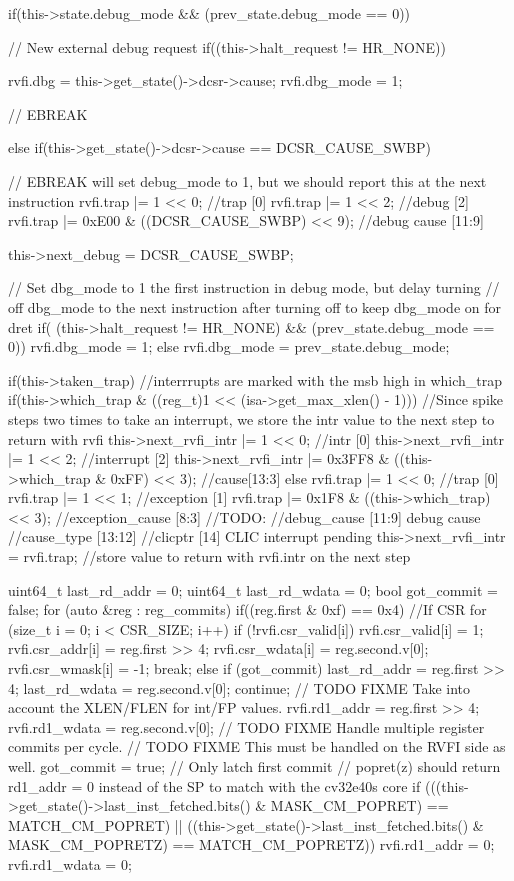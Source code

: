\begin{clisting}
{  if(this->state.debug_mode  && (prev_state.debug_mode == 0)){
    // New external debug request
    if((this->halt_request != HR_NONE)){ 
      rvfi.dbg = this->get_state()->dcsr->cause;
      rvfi.dbg_mode = 1;

    // EBREAK
    } else if(this->get_state()->dcsr->cause == DCSR_CAUSE_SWBP) {
      // EBREAK will set debug_mode to 1, but we should report this at the next instruction
      rvfi.trap |= 1 << 0; //trap [0]
      rvfi.trap |= 1 << 2; //debug [2]
      rvfi.trap |= 0xE00 & ((DCSR_CAUSE_SWBP) << 9); //debug cause [11:9]
      
      this->next_debug = DCSR_CAUSE_SWBP;
    }
  }

  // Set dbg_mode to 1 the first instruction in debug mode, but delay turning 
  // off dbg_mode to the next instruction after turning off to keep dbg_mode on for dret
  if( (this->halt_request != HR_NONE)  && (prev_state.debug_mode == 0)) {
    rvfi.dbg_mode = 1;
  } else {
    rvfi.dbg_mode = prev_state.debug_mode;
  }


  if(this->taken_trap) {
    //interrrupts are marked with the msb high in which_trap
    if(this->which_trap & ((reg_t)1 << (isa->get_max_xlen() - 1))) { 
      //Since spike steps two times to take an interrupt, we store the intr value to the next step to return with rvfi
      this->next_rvfi_intr |= 1 << 0; //intr [0]
      this->next_rvfi_intr |= 1 << 2; //interrupt [2]
      this->next_rvfi_intr |= 0x3FF8 & ((this->which_trap & 0xFF) << 3); //cause[13:3]
    } else{
      rvfi.trap |= 1 << 0; //trap [0]
      rvfi.trap |= 1 << 1; //exception [1]
      rvfi.trap |= 0x1F8 & ((this->which_trap) << 3); //exception_cause [8:3]
      //TODO:
      //debug_cause     [11:9] debug cause
      //cause_type      [13:12]
      //clicptr         [14]  CLIC interrupt pending
      this->next_rvfi_intr = rvfi.trap; //store value to return with rvfi.intr on the next step
    }
  }

  uint64_t last_rd_addr = 0;
  uint64_t last_rd_wdata = 0;
  bool got_commit = false;
  for (auto &reg : reg_commits) {
    if((reg.first & 0xf) == 0x4) { //If CSR
      for (size_t i = 0; i < CSR_SIZE; i++) {
          if (!rvfi.csr_valid[i]) {
              rvfi.csr_valid[i] = 1;
              rvfi.csr_addr[i] = reg.first >> 4;
              rvfi.csr_wdata[i] = reg.second.v[0];
              rvfi.csr_wmask[i] = -1;
              break;
          }
      }
    }
    else {
      if (got_commit) {
        last_rd_addr = reg.first >> 4;
        last_rd_wdata = reg.second.v[0];
        continue;
      }
      // TODO FIXME Take into account the XLEN/FLEN for int/FP values.
      rvfi.rd1_addr = reg.first >> 4;
      rvfi.rd1_wdata = reg.second.v[0];
      // TODO FIXME Handle multiple register commits per cycle.
      // TODO FIXME This must be handled on the RVFI side as well.
      got_commit = true; // Only latch first commit
    }
  }
  // popret(z) should return rd1_addr = 0 instead of the SP to match with the cv32e40s core
  if (((this->get_state()->last_inst_fetched.bits() & MASK_CM_POPRET) == MATCH_CM_POPRET) ||
      ((this->get_state()->last_inst_fetched.bits() & MASK_CM_POPRETZ) == MATCH_CM_POPRETZ)) {
    rvfi.rd1_addr = 0;
    rvfi.rd1_wdata = 0;
  }

}
\end{clisting}
